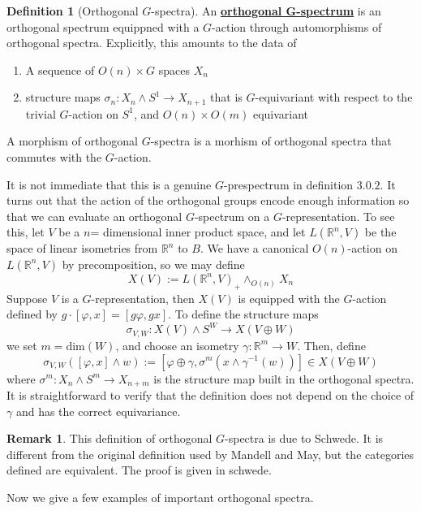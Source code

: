 \documentclass{article}
\theoremstyle{definition}
\theoremstyle{definition}
\newtheorem{definition}{Definition}[theorem]
\theoremstyle{definition}
\newtheorem{remark}{Remark}[theorem]
\theoremstyle{definition}
\theoremstyle{definition}
\theoremstyle{definition}
\theoremstyle{definition}
\begin{document}
\begin{tcolorbox}[colback=purple!5!white,colframe=purple!75!black]
\begin{definition}[Orthogonal $G$-spectra]
An \underline{\textbf{orthogonal G-spectrum}} is an orthogonal spectrum equippned with a $G$-action through automorphisms of orthogonal spectra. Explicitly, this amounts to the data of 
\begin{enumerate}
    \item A sequence of $O(n)\times G$ spaces $X_n$
    \item structure maps $\sigma_n: X_n\wedge S^1\to X_{n+1}$ that is $G$-equivariant with respect to the trivial $G$-action on $S^1$, and $O(n)\times O(m)$ equivariant 
\end{enumerate}

A morphism of orthogonal $G$-spectra is a morhism of orthogonal spectra that commutes with the $G$-action. 
\end{definition}
\end{tcolorbox}
It is not immediate that this is a genuine $G$-prespectrum in definition $3.0.2$. It turns out that the action of the orthogonal groups encode enough information so that we can evaluate an orthogonal $G$-spectrum on a $G$-representation. To see this, let $V$ be a $n$= dimensional inner product space, and let $L(\mathbb{R}^n, V)$ be the space of linear isometries from $\mathbb{R}^n$ to $B$. We have a canonical $O(n)$-action on $L(\mathbb{R}^n, V)$ by precomposition, so we may define 
\[X(V):=L(\mathbb{R}^n, V)_+\wedge_{O(n)}X_n\]
Suppose $V$ is a $G$-representation, then $X(V)$ is equipped with the $G$-action defined by $g\cdot [\varphi, x]=[g\varphi, gx]$. To define the structure maps 
\[\sigma_{V,W}: X(V)\wedge S^W\to X(V\oplus W)\]
 we set $m=\textrm{dim}(W)$, and choose an isometry $\gamma: \mathbb{R}^m\to W$. Then, define 
 \[\sigma_{V,W}([\varphi,x]\wedge w):=[\varphi\oplus \gamma, \sigma^m(x\wedge \gamma^{-1}(w))]\in X(V\oplus W)\]
where $\sigma^m:X_n\wedge S^m\to X_{n+m} $ is the structure map built in the orthogonal spectra. It is straightforward to verify that the definition does not depend on the choice of $\gamma$ and has the correct equivariance. 


\begin{tcolorbox}[colback=green!5!white,colframe=green!30!white]
\begin{remark}
This definition of orthogonal $G$-spectra is due to Schwede. It is different from the original definition used by Mandell and May, but the categories defined are equivalent. The proof is given in schwede.
\end{remark}
\end{tcolorbox}
Now we give a few examples of important orthogonal spectra.
\end{document}
